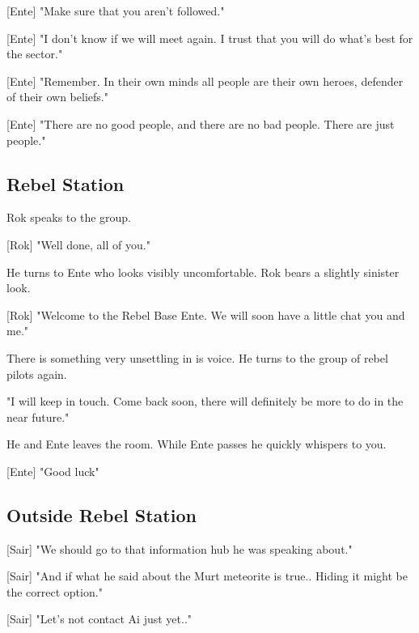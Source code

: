 \documentclass[a4paper,12pt]{article}
\begin{document}
[Ente] "Make sure that you aren't followed."

[Ente] "I don't know if we will meet again. I trust that you will do what's best for the sector."

[Ente] "Remember. In their own minds all people are their own heroes, defender of their own beliefs."

[Ente] "There are no good people, and there are no bad people. There are just people."

\subsection{Rebel Station}

Rok speaks to the group. 

[Rok] "Well done, all of you."

He turns to Ente who looks visibly uncomfortable. Rok bears a slightly sinister look.

[Rok] "Welcome to the Rebel Base Ente. We will soon have a little chat you and me."

There is something very unsettling in is voice. He turns to the group of rebel pilots again.

"I will keep in touch. Come back soon, there will definitely be more to do in the near future."

He and Ente leaves the room. While Ente passes he quickly whispers to you. 

[Ente] "Good luck"

\subsection{Outside Rebel Station}

[Sair] "We should go to that information hub he was speaking about."

[Sair] "And if what he said about the Murt meteorite is true.. Hiding it might be the correct option."

[Sair] "Let's not contact Ai just yet.."
\end{document}

